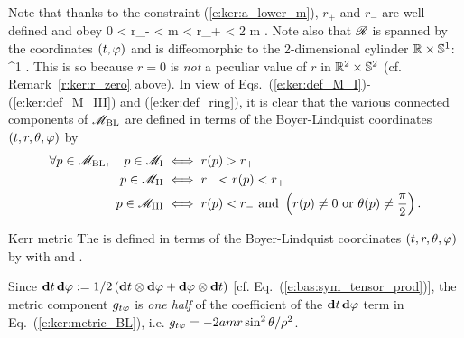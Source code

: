 Note that thanks to the constraint (\ref{e:ker:a_lower_m}), $r_+$ and $r_-$
are well-defined and obey
\be \label{e:ker:order_r_pm}
    0 < r_- < m < r_+ < 2 m .
\ee
Note also that $\mathscr{R}$ is spanned by the coordinates $(t,\varphi)$ and is diffeomorphic to the 2-dimensional cylinder $\mathbb{R}\times\mathbb{S}^1$:
\be \label{e:ker:ring_R_S1}
    \ring \simeq \R\times\SS^1 .
\ee
This is so because $r=0$ is \emph{not} a peculiar value of $r$ in $\mathbb{R}^2\times\mathbb{S}^2$
(cf. Remark~\ref{r:ker:r_zero} above).
In view of Eqs.~(\ref{e:ker:def_M_I})-(\ref{e:ker:def_M_III}) and (\ref{e:ker:def_ring}), it is clear that
the various connected components of $\mathscr{M}_{\rm BL}$ are defined in terms of
the Boyer-Lindquist coordinates $(t,r,\theta,\varphi)$ by
\begin{subequations}
\label{e:ker:M_I_III_r}
\begin{align}
  \forall p \in  \mathscr{M}_{\rm BL},\quad p \in \mathscr{M}_{\rm I} & \iff r(p) > r_+ \\
    \quad p \in \mathscr{M}_{\rm II} & \iff r_- < r(p) < r_+ \\
    \quad p \in \mathscr{M}_{\rm III} & \iff r(p) < r_-\ \mbox{and}\
    \left( r(p) \not=0 \ \mbox{or}\ \theta(p) \not=\frac{\pi}{2} \right) .
\end{align}
\end{subequations}

\begin{tdef}{Kerr metric}{}
The  is defined
in terms of the Boyer-Lindquist coordinates $(t,r,\theta,\varphi)$
by
\be \label{e:ker:metric_BL}
\ee
with
\be \label{e:ker:def_rho2}
\ee
and
\be \label{e:ker:def_Delta}
     .
\ee
\end{tdef}

\begin{remark}
Since $\mathbf{d} t\, \mathbf{d}\varphi := 1/2 \, (\mathbf{d} t\otimes \mathbf{d}\varphi +  \mathbf{d}\varphi\otimes\mathbf{d} t)$
[cf. Eq.~(\ref{e:bas:sym_tensor_prod})], the metric component $g_{t\varphi}$
is \emph{one half} of the coefficient of the $\mathbf{d} t\, \mathbf{d}\varphi$ term
in Eq.~(\ref{e:ker:metric_BL}), i.e.
$ g_{t\varphi} = - 2 a m  r \sin^2\theta/\rho^2$.
\end{remark}

